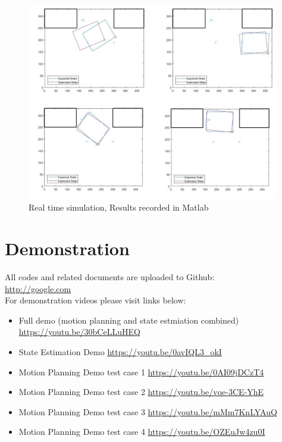 \documentclass[12pt, letterpaper]{amsart} %
\numberwithin{equation}{section}
\begin{document}
\begin{figure}[h!]
\includegraphics[width=110mm]{fig_19.png}
\caption{Real time simulation, Results recorded in Matlab}
\label{fig:figure19}	
\end{figure}
\newpage

\section{Demonstration}
All codes and related documents are uploaded to Github: 
\\
\url{http://google.com}
\\For demonstration videos please visit links below:
\begin{itemize}
\item Full demo (motion planning and state estmiation combined) \\
\url{https://youtu.be/30bCeLLuHEQ}
\item State Estimation Demo 
\url{https://youtu.be/0avIQL3_okI}
\item Motion Planning Demo test case 1
\url{https://youtu.be/0AI09jDCzT4}
\item Motion Planning Demo test case 2 
\url{https://youtu.be/vqe-3CE-YhE}
\item Motion Planning Demo test case 3 
\url{https://youtu.be/mMm7KnLYAuQ}
\item Motion Planning Demo test case 4 
\url{https://youtu.be/OZEuJw4zu0I}
\end{itemize}


 
\end{document}
